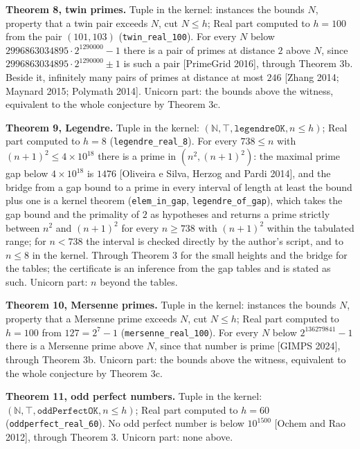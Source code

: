 \documentclass[10pt,twocolumn]{article}
\begin{document}
\textbf{Theorem 8, twin primes.} Tuple in the kernel: instances the
bounds \(N\), property that a twin pair exceeds \(N\), cut \(N \le h\);
Real part computed to \(h = 100\) from the pair \((101, 103)\)
(\texttt{twin\_real\_100}). For every \(N\) below
\(2996863034895 \cdot 2^{1290000} - 1\) there is a pair of primes at
distance \(2\) above \(N\), since
\(2996863034895 \cdot 2^{1290000} \pm 1\) is such a pair {[}PrimeGrid
2016{]}, through Theorem 3b. Beside it, infinitely many pairs of primes
at distance at most \(246\) {[}Zhang 2014; Maynard 2015; Polymath
2014{]}. Unicorn part: the bounds above the witness, equivalent to the
whole conjecture by Theorem 3c.

\textbf{Theorem 9, Legendre.} Tuple in the kernel:
\((\mathbb{N}, \top, \texttt{legendreOK}, n \le h)\); Real part computed
to \(h = 8\) (\texttt{legendre\_real\_8}). For every \(738 \le n\) with
\((n+1)^2 \le 4 \times 10^{18}\) there is a prime in \((n^2, (n+1)^2)\):
the maximal prime gap below \(4 \times 10^{18}\) is \(1476\) {[}Oliveira
e Silva, Herzog and Pardi 2014{]}, and the bridge from a gap bound to a
prime in every interval of length at least the bound plus one is a
kernel theorem (\texttt{elem\_in\_gap}, \texttt{legendre\_of\_gap}),
which takes the gap bound and the primality of \(2\) as hypotheses and
returns a prime strictly between \(n^2\) and \((n+1)^2\) for every
\(n \ge 738\) with \((n+1)^2\) within the tabulated range; for
\(n < 738\) the interval is checked directly by the author's script, and
to \(n \le 8\) in the kernel. Through Theorem 3 for the small heights
and the bridge for the tables; the certificate is an inference from the
gap tables and is stated as such. Unicorn part: \(n\) beyond the tables.

\textbf{Theorem 10, Mersenne primes.} Tuple in the kernel: instances the
bounds \(N\), property that a Mersenne prime exceeds \(N\), cut
\(N \le h\); Real part computed to \(h = 100\) from \(127 = 2^7 - 1\)
(\texttt{mersenne\_real\_100}). For every \(N\) below
\(2^{136279841} - 1\) there is a Mersenne prime above \(N\), since that
number is prime {[}GIMPS 2024{]}, through Theorem 3b. Unicorn part: the
bounds above the witness, equivalent to the whole conjecture by Theorem
3c.

\textbf{Theorem 11, odd perfect numbers.} Tuple in the kernel:
\((\mathbb{N}, \top, \texttt{oddPerfectOK}, n \le h)\); Real part
computed to \(h = 60\) (\texttt{oddperfect\_real\_60}). No odd perfect
number is below \(10^{1500}\) {[}Ochem and Rao 2012{]}, through Theorem
3. Unicorn part: none above.
\end{document}
